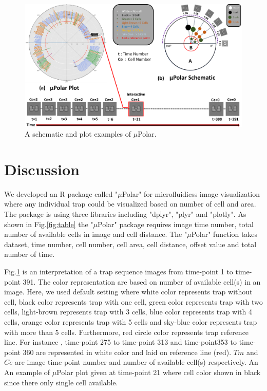 \documentclass[conference]{IEEEtran}
\begin{document}
 
\begin{figure}
\centering
\includegraphics[width=\textwidth,height=10 cm]{Patterns/polar.pdf}
\caption{ A schematic and plot examples of $\mu$Polar.}
\label{fig:polar}
\end{figure}

\section{Discussion}
We developed an R package called "$\mu$Polar" for microfluidicss image visualization where any individual trap could be visualized based on number of cell and area. The package is using three libraries including "dplyr", "plyr" and "plotly". As shown in Fig.\ref{fig:table} the "$\mu$Polar" package requires image time number, total number of available cells in image and cell distance. The "$\mu$Polar" function takes dataset, time number, cell number, cell area, cell distance, offset value and total number of time. 

Fig.\ref{fig:polar} is an interpretation of a trap sequence images from time-point 1 to time-point 391. The color representation are based on number of available cell(s) in an image. Here, we used default setting where white color represents trap without cell, black color represents trap with one cell, green color represents trap with two cells, light-brown represents trap with 3 cells, blue color represents trap with 4 cells, orange color represents trap with 5 cells and sky-blue color represents trap with more than 5 cells. Furthermore, red circle color represents trap reference line. For instance , time-point 275 to  time-point 313 and time-point353 to time-point 360 are represented in white color and  laid on reference line (red). $ Tm  $ and  $ Ce $  are image time-point number and number of available cell(s) respectively. An An example of $\mu$Polar plot given at time-point 21 where cell color shown in black since there only single cell available.  
\end{document}
